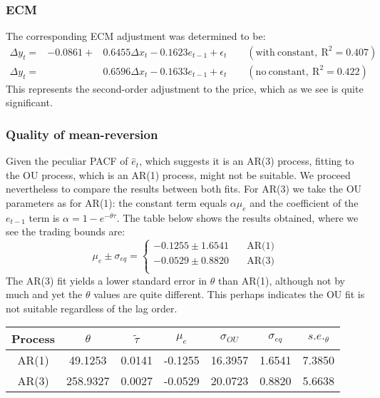 \documentclass[11pt]{article}
\begin{document}
    \subsubsection{ECM}\label{ecm}
The corresponding ECM adjustment was determined to be:
\begin{equation}
\begin{array}{ccc}
\Delta y_{t}  = & -0.0861 + & 0.6455 \Delta x_t -0.1623 e_{t-1} + \epsilon_t \qquad \mathrm{(with~constant,~R^2=0.407)} \\
\Delta y_{t}  = & & 0.6596 \Delta x_t -0.1633 e_{t-1} + \epsilon_t
\qquad \mathrm{(no~constant, ~R^2=0.422)}
\end{array}
\end{equation}
This represents the second-order adjustment to the price, which as we
see is quite significant.
    \subsubsection{Quality of
mean-reversion}\label{quality-of-mean-reversion}
    Given the peculiar PACF of \(\hat{e}_t\), which suggests it is an AR(3)
process, fitting to the OU process, which is an AR(1) process, might not
be suitable. We proceed nevertheless to compare the results between both
fits. For AR(3) we take the OU parameters as for AR(1): the constant
term equals \(\alpha \mu_e\) and the coefficient of the \(e_{t-1}\) term
is \(\alpha = 1 - e^{-\theta \tau}\). The table below shows the results
obtained, where we see the trading bounds are:
\begin{equation}
 \mu_e \pm \sigma_{eq} =
  \begin{cases}
    -0.1255 \pm  1.6541 & \quad \text{AR(1)} \\
    -0.0529 \pm  0.8820  & \quad \text{AR(3)}\\
  \end{cases}
\end{equation}
The AR(3) fit yields a lower standard error in \(\theta\) than AR(1),
although not by much and yet the \(\theta\) values are quite different.
This perhaps indicates the OU fit is not suitable regardless of the lag
order.
    \begin{longtable}[]{@{}ccccccc@{}}
\toprule
Process & \(\theta\) & \(\tilde{\tau}\) & \(\mu_e\) & \(\sigma_{OU}\) &
\(\sigma_{eq}\) & \(s.e._\theta\)\tabularnewline
\midrule
\endhead
AR(1) & 49.1253 & 0.0141 & -0.1255 & 16.3957 & 1.6541 &
7.3850\tabularnewline
AR(3) & 258.9327 & 0.0027 & -0.0529 & 20.0723 & 0.8820 &
5.6638\tabularnewline
\bottomrule
\end{longtable}
    \begin{center}
    \end{center}
    { \hspace*{\fill} \\}
    
\end{document}
